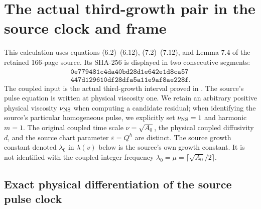 \section{The actual third-growth pair in the source clock and frame}
\label{tgframe:section}

This calculation uses equations (6.2)--(6.12), (7.2)--(7.12), and
Lemma 7.4 of the retained 166-page source. Its SHA-256 is displayed
in two consecutive segments:
\[
\begin{gathered}
\texttt{0e779481c4da40bd28d1e642e1d8ca57}\\
\texttt{447d129610df28dfa5a11e9af8ae228f}.
\end{gathered}
\]
The coupled input is the actual third-growth interval proved in
. The source's pulse
equation is written at physical viscosity one. We retain an arbitrary
positive physical viscosity $\nu_{\rm NS}$ when computing a candidate
residual; when identifying the source's particular homogeneous pulse,
we explicitly set $\nu_{\rm NS}=1$ and harmonic $m=1$.
The original coupled time scale $\nu=\sqrt{A_0}$, the physical coupled
diffusivity $d$, and the source chart parameter $\varepsilon=Q^h$
are distinct.
The source growth constant denoted $\lambda_0$ in $\lambda(v)$ below
is the source's own growth constant. It is not identified with the
coupled integer frequency $\lambda_0=\mu=\lceil\sqrt{A_0}/2\rceil$.

\subsection{Exact physical differentiation of the source pulse clock}

